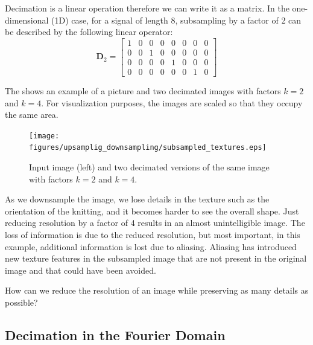 Decimation is a linear operation therefore we can write it as a matrix. In the one-dimensional (1D) case, for a signal of length 8, subsampling by a factor of 2 can be described by the following linear operator:
\begin{equation}
	\mathbf{D}_2 = \left[
		\begin{array}{cccccccc}
			1 & 0 & 0 & 0 & 0 & 0 & 0 & 0 \\
			0 & 0 & 1 & 0 & 0 & 0 & 0 & 0 \\
			0 & 0 & 0 & 0 & 1 & 0 & 0 & 0 \\
			0 & 0 & 0 & 0 & 0 & 0 & 1 & 0
		\end{array}
		\right]
\end{equation}


The \fig{\ref{fig:subsampled_textures}} shows an example of a picture and two decimated images with factors $k=2$ and $k=4$. For visualization purposes, the images are scaled so that they occupy the same area.
\begin{figure}[h]
	\centerline{
		\texttt{[image: figures/upsamplig\_downsampling/subsampled\_textures.eps]}
	}
	\caption{Input image (left) and two decimated versions of the same image with factors $k=2$ and $k=4$.}
	\label{fig:subsampled_textures}
\end{figure}

As we downsample the image, we lose details in the texture such as the orientation of the knitting, and it becomes harder to see the overall shape. Just reducing resolution by a factor of 4 results in an almost unintelligible image. The loss of information is due to the reduced resolution, but most important, in this example, additional information is lost due to aliasing. Aliasing has introduced new texture features in the subsampled image that are not present in the original image and that could have been avoided.

How can we reduce the resolution of an image while preserving as many details as possible?


\subsection{Decimation in the Fourier Domain}


